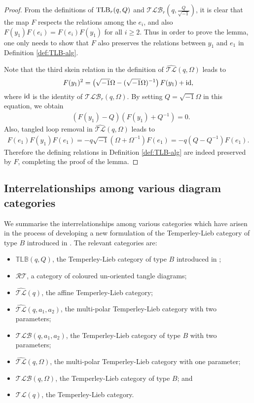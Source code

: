 \documentclass[12pt]{amsart}
\theoremstyle{definition}
\theoremstyle{remark}
\numberwithin{equation}{section}
\newcommand{\id}{{\rm{id}}}
\newcommand{\End}{{\rm{End}}}
\newcommand{\tl}{Temperley-Lieb }
\newcommand{\ATLC}{{\widehat{\mathcal{TL}}}}
\newcommand{\TLC}{\mathcal{TL}}
\newcommand{\TLB}{{\rm{TLB}}}
\newcommand{\TLBB}{{\mathbb{TLB}}}
\newcommand{\TLBC}{\mathcal{TLB}}
\newcommand{\RTC}{\mathcal{RT}}
\begin{document}
\begin{proof} From the definitions of $\TLB_r(q, Q)$ and $\TLBC_r\left(q, \frac{Q}{\sqrt{-1}}\right)$, 
it is clear that the map $F$ respects the relations among the $e_i$, and also $F(y_1) F(e_i) = F(e_i) F(y_1)$ for all $i\ge 2$. 
Thus in order to prove the lemma, one only needs to show that $F$ also preserves the relations 
between $y_1$ and $e_1$ in Definition \ref{def:TLB-alg}. 

Note that the third skein relation in the definition of $\ATLC(q, \Omega)$ leads to
\[
F(y_1)^2 = \left(\sqrt{-1}\Omega- (\sqrt{-1}\Omega)^{-1}\right) F(y_1)+ \id, 
\]
where $\id$ is the identity of $\TLBC_r\left(q, \Omega\right)$.  By setting $Q={\sqrt{-1}}\Omega$ in this equation, we obtain 
\begin{align}
&(F(y_1)-Q)(F(y_1)+Q^{-1})=0.  \label{eq:F-skein}
 \end{align}
Also, tangled loop removal in $\ATLC(q, \Omega)$ leads to 
\begin{align}
F(e_1) F(y_1) F(e_1) = -q\sqrt{-1} (\Omega+\Omega^{-1}) F(e_1) = -q(Q-Q^{-1}) F(e_1).
\label{eq:F-inv}
 \end{align}
 Therefore the defining relations in Definition \ref{def:TLB-alg}
are indeed preserved by $F$, completing the proof of the lemma. 
\end{proof}






%
%
\subsection{Interrelationships among various diagram categories} \label{sect:summary}
%
%

We summarise the interrelationships among various categories which have arisen in the process of 
developing a new formulation of the \tl category of type $B$ introduced in \cite{GL03}. The relevant categories are:
\begin{itemize}
\item $\TLBB(q,Q)$,  the \tl category of type $B$ introduced in \cite{GL03};
\item $\RTC$, a category of coloured un-oriented tangle diagrams; 
\item $\ATLC(q)$,  the affine \tl category; 
\item $\ATLC(q, a_1, a_2)$,  the multi-polar \tl category with two parameters;
\item $\TLBC(q, a_1, a_2)$,  the \tl category of type $B$ with two parameters;
\item $\ATLC(q, \Omega)$,  the multi-polar \tl category with one parameter;
\item $\TLBC(q, \Omega)$,  the \tl category of type $B$; and
\item $\TLC(q)$,  the \tl category.
\end{itemize}
\end{document}
